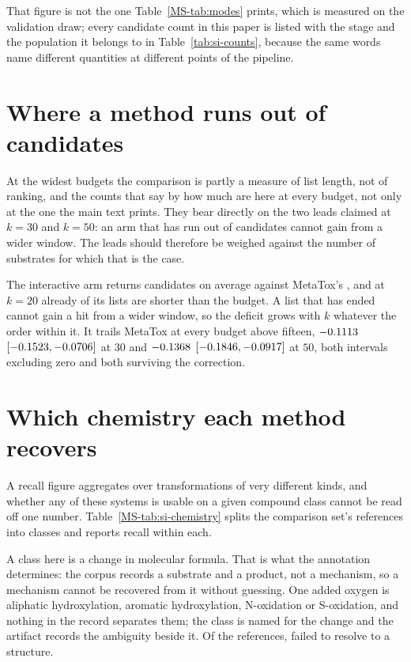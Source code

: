 \documentclass[journal=jcisd8,manuscript=suppinfo,layout=onecolumn]{achemso}
\begin{document}
That figure is not the one Table~\ref{MS-tab:modes} prints, which is
measured on the validation draw; every candidate count in this paper is listed with the stage and
the population it belongs to in Table~\ref{tab:si-counts}, because the same words name
different quantities at different points of the pipeline.
\section{Where a method runs out of candidates}
\label{sec:si-short}



At the widest budgets the comparison is partly a measure of list length, not of ranking, and the
counts that say by how much are here at every budget, not only at the one the main text
prints. They bear directly on the two leads claimed at $k=30$ and $k=50$: an arm that has run out
of candidates cannot gain from a wider window. The leads should therefore be weighed against the
number of substrates for which that is the case.


The interactive arm returns \numEmittedTrained{} candidates on average against MetaTox's
\numEmittedMetatox{}, and at $k=20$ already \numShortTrainedTwoZero{} of its \numPopulationN{}
lists are shorter than the budget. A list that has ended cannot gain a hit from a wider window, so
the deficit grows with $k$ whatever the order within it. It trails MetaTox at every budget above
fifteen, $-0.1113$ $[-0.1523,
-0.0706]$ at $30$ and $-0.1368$
$[-0.1846, -0.0917]$ at $50$, both intervals
excluding zero and both surviving the correction.
\section{Which chemistry each method recovers}
\label{sec:si-chemistry}

A recall figure aggregates over transformations of very different kinds, and whether any of these
systems is usable on a given compound class cannot be read off one
number.
Table~\ref{MS-tab:si-chemistry} splits the comparison set's \numChemReferences{} references into
\numChemClasses{} classes and reports recall within each.

A class here is a change in molecular formula. That is what the annotation determines: the corpus
records a substrate and a product, not a mechanism, so a mechanism cannot be recovered from it
without guessing. One added oxygen is aliphatic hydroxylation, aromatic hydroxylation,
N-oxidation or S-oxidation, and nothing in the record separates them; the class is named for the
change and the artifact records the ambiguity beside it. Of the references, \numChemUnresolvedWord{}
failed to resolve to a
structure.
\end{document}
